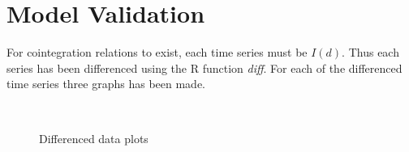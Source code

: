 \section{Model Validation}
For cointegration relations to exist, each time series must be $I(d)$. Thus each series has been differenced using the R function \textit{diff}. For each of the differenced time series three graphs has been made.
\begin{figure}[H]
  \centering
  \quad
  \\
  \quad
  \caption{Differenced data plots}
\end{figure}

